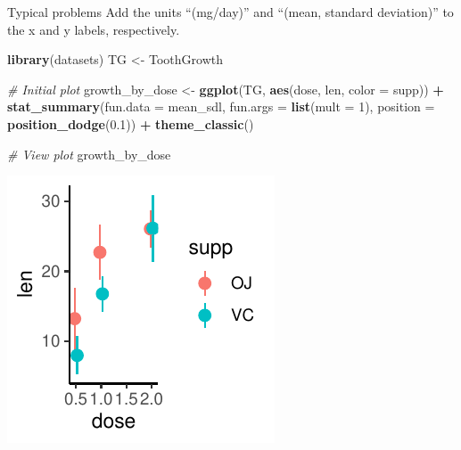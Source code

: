 \documentclass[
  ignorenonframetext,
]{beamer}
\newenvironment{Shaded}{\begin{snugshade}}{\end{snugshade}}
\newcommand{\AttributeTok}[1]{\textcolor[rgb]{0.13,0.29,0.53}{#1}}
\newcommand{\CommentTok}[1]{\textcolor[rgb]{0.56,0.35,0.01}{\textit{#1}}}
\newcommand{\DecValTok}[1]{\textcolor[rgb]{0.00,0.00,0.81}{#1}}
\newcommand{\FloatTok}[1]{\textcolor[rgb]{0.00,0.00,0.81}{#1}}
\newcommand{\FunctionTok}[1]{\textcolor[rgb]{0.13,0.29,0.53}{\textbf{#1}}}
\newcommand{\NormalTok}[1]{#1}
\newcommand{\OtherTok}[1]{\textcolor[rgb]{0.56,0.35,0.01}{#1}}
\newcommand{\SpecialCharTok}[1]{\textcolor[rgb]{0.81,0.36,0.00}{\textbf{#1}}}
\begin{document}
\begin{frame}[fragile]{Typical problems}
\label{typical-problems-7}
Add the units ``(mg/day)'' and ``(mean, standard deviation)'' to the x
and y labels, respectively.


\begin{Shaded}
\begin{Highlighting}[]
\FunctionTok{library}\NormalTok{(datasets)}
\NormalTok{TG }\OtherTok{\textless{}{-}}\NormalTok{ ToothGrowth}

\CommentTok{\# Initial plot}
\NormalTok{growth\_by\_dose }\OtherTok{\textless{}{-}} \FunctionTok{ggplot}\NormalTok{(TG, }\FunctionTok{aes}\NormalTok{(dose, len, }\AttributeTok{color =}\NormalTok{ supp)) }\SpecialCharTok{+}
    \FunctionTok{stat\_summary}\NormalTok{(}\AttributeTok{fun.data =}\NormalTok{ mean\_sdl, }\AttributeTok{fun.args =} \FunctionTok{list}\NormalTok{(}\AttributeTok{mult =} \DecValTok{1}\NormalTok{),}
        \AttributeTok{position =} \FunctionTok{position\_dodge}\NormalTok{(}\FloatTok{0.1}\NormalTok{)) }\SpecialCharTok{+} \FunctionTok{theme\_classic}\NormalTok{()}

\CommentTok{\# View plot}
\NormalTok{growth\_by\_dose}
\end{Highlighting}
\end{Shaded}

\begin{center}\includegraphics[width=0.5\linewidth]{Figs/unnamed-chunk-122-1} \end{center}
\end{frame}
\end{document}
